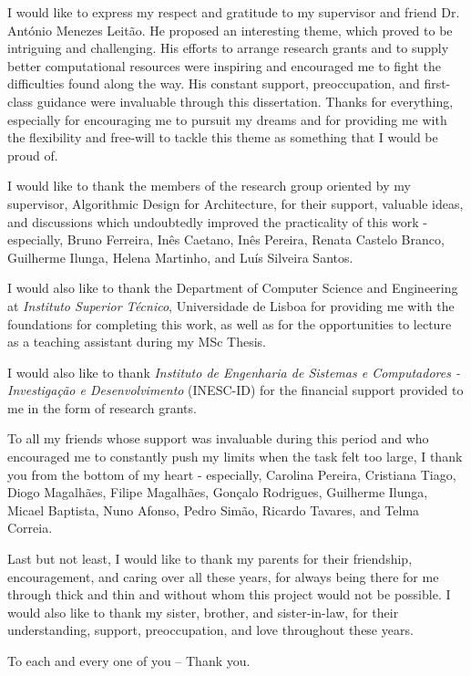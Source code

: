 
I would like to express my respect and gratitude to my supervisor and friend Dr. António Menezes Leitão. He proposed an interesting theme, which proved to be intriguing and challenging. His efforts to arrange research grants and to supply better computational resources were inspiring and encouraged me to fight the difficulties found along the way. His constant support, preoccupation, and first-class guidance were invaluable through this dissertation. Thanks for everything, especially for encouraging me to pursuit my dreams and for providing me with the flexibility and free-will to tackle this theme as something that I would be proud of.  

I would like to thank the members of the research group oriented by my supervisor, Algorithmic Design for Architecture, for their support, valuable ideas, and discussions which undoubtedly improved the practicality of this work - especially, Bruno Ferreira, Inês Caetano, Inês Pereira, Renata Castelo Branco, Guilherme Ilunga, Helena Martinho, and Luís Silveira Santos. 

I would also like to thank the Department of Computer Science and Engineering at \textit{Instituto Superior Técnico}, Universidade de Lisboa for providing me with the foundations for completing this work, as well as for the opportunities to lecture as a teaching assistant during my MSc Thesis. 

I would also like to thank \textit{Instituto de Engenharia de Sistemas e Computadores - Investigação e Desenvolvimento} (INESC-ID) for the financial support provided to me in the form of research grants.


To all my friends whose support was invaluable during this period and who encouraged me to constantly push my limits when the task felt too large, I thank you from the bottom of my heart - especially, Carolina Pereira, Cristiana Tiago, Diogo Magalhães, Filipe Magalhães, Gonçalo Rodrigues, Guilherme Ilunga, Micael Baptista, Nuno Afonso, Pedro Simão, Ricardo Tavares, and Telma Correia.

Last but not least, I would like to thank my parents for their friendship, encouragement, and caring over all these years, for always being there for me through thick and thin and without whom this project would not be possible. I would also like to thank my sister, brother, and sister-in-law, for their understanding, support, preoccupation, and love throughout these years.

To each and every one of you -- Thank you.